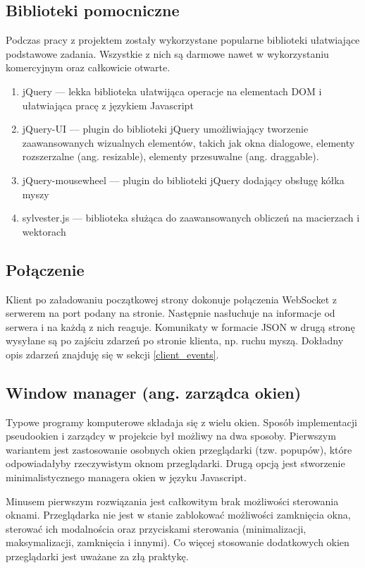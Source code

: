 \subsection{Biblioteki pomocniczne}
Podczas pracy z projektem zostały wykorzystane popularne biblioteki ułatwiające podstawowe zadania. Wszystkie z nich są darmowe nawet w wykorzystaniu komercyjnym oraz całkowicie otwarte.
\begin{enumerate}
  \item jQuery --- lekka biblioteka ułatwijąca operacje na elementach DOM i ułatwiająca pracę z językiem Javascript
  \item jQuery-UI --- plugin do biblioteki jQuery umożliwiający tworzenie zaawansowanych wizualnych elementów, takich jak okna dialogowe, elementy rozszerzalne (ang. resizable), elementy przesuwalne (ang. draggable).
  \item jQuery-mousewheel --- plugin do biblioteki jQuery dodający obsługę kółka myszy
  \item sylvester.js --- biblioteka służąca do zaawansowanych obliczeń na macierzach i wektorach
\end{enumerate}


\subsection{Połączenie}
Klient po załadowaniu początkowej strony dokonuje połączenia WebSocket z serwerem na port podany na stronie. Następnie nasłuchuje na informacje od serwera i na każdą z nich reaguje. Komunikaty w formacie JSON w drugą stronę wysyłane są po zajściu zdarzeń po stronie klienta, np. ruchu myszą. Dokładny opis zdarzeń znajduję się w sekcji \ref{client_events}.

\subsection{Window manager (ang. zarządca okien)}
Typowe programy komputerowe składaja się z wielu okien. Sposób implementacji pseudookien i zarządcy w projekcie był możliwy na dwa sposoby.
Pierwszym wariantem jest zastosowanie osobnych okien przeglądarki (tzw. popupów), które odpowiadałyby rzeczywistym oknom przeglądarki.
Drugą opcją jest stworzenie minimalistycznego managera okien w języku Javascript.

Minusem pierwszym rozwiązania jest całkowitym brak możliwości sterowania oknami. Przeglądarka nie jest w stanie zablokować możliwości zamknięcia okna, sterować ich modalnościa oraz przyciskami sterowania (minimalizacji, maksymalizacji, zamknięcia i innymi). Co więcej stosowanie dodatkowych okien przeglądarki jest uważane za złą praktykę.

